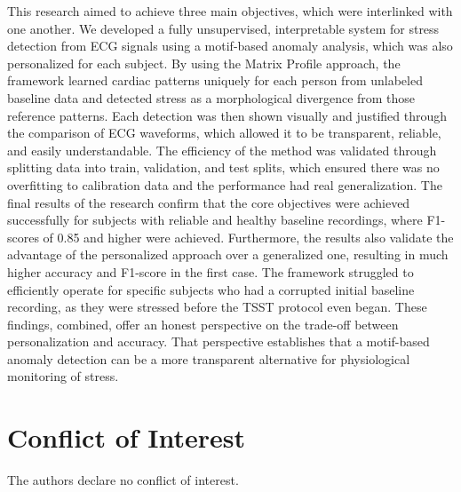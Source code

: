 \documentclass[conference,10pt]{IEEEtran}
\begin{document}
This research aimed to achieve three main objectives, which were interlinked with one another. We developed a fully unsupervised, interpretable system for stress detection from ECG signals using a motif-based anomaly analysis, which was also personalized for each subject. By using the Matrix Profile approach, the framework learned cardiac patterns uniquely for each person from unlabeled baseline data and detected stress as a morphological divergence from those reference patterns. Each detection was then shown visually and justified through the comparison of ECG waveforms, which allowed it to be transparent, reliable, and easily understandable. 
The efficiency of the method was validated through splitting data into train, validation, and test splits, which ensured there was no overfitting to calibration data and the performance had real generalization.
The final results of the research confirm that the core objectives were achieved successfully for subjects with reliable and healthy baseline recordings, where F1-scores of 0.85 and higher were achieved. Furthermore, the results also validate the advantage of the personalized approach over a generalized one, resulting in much higher accuracy and F1-score in the first case.
The framework struggled to efficiently operate for specific subjects who had a corrupted initial baseline recording, as they were stressed before the TSST protocol even began.
These findings, combined, offer an honest perspective on the trade-off between personalization and accuracy. That perspective establishes that a motif-based anomaly detection can be a more transparent alternative for physiological monitoring of stress.



\section*{Conflict of Interest} The authors declare no conflict of interest.
\end{document}
